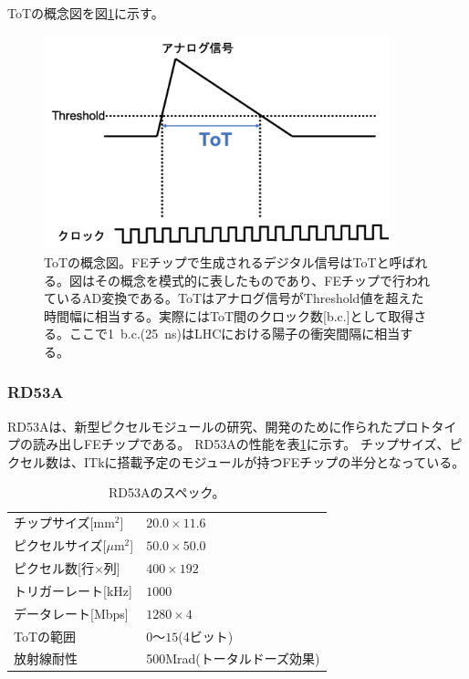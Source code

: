 ToTの概念図を図\ref{tot_algorithm}に示す。

\begin{figure}[bpt]\centering
\includegraphics[width=10cm]{./tot_algorithm.png}
\caption[ToTの概念図]{ToTの概念図。FEチップで生成されるデジタル信号はToTと呼ばれる。図はその概念を模式的に表したものであり、FEチップで行われているAD変換である。ToTはアナログ信号がThreshold値を超えた時間幅に相当する。実際にはToT間のクロック数[b.c.]として取得さる。ここで1~b.c.(25~ns)はLHCにおける陽子の衝突間隔に相当する。}
\label{tot_algorithm}
\end{figure}

\subsubsection{RD53A}
RD53A\cite{2-1}は、新型ピクセルモジュールの研究、開発のために作られたプロトタイプの読み出しFEチップである。
RD53Aの性能を表\ref{rd53a_spec}に示す。
チップサイズ、ピクセル数は、ITkに搭載予定のモジュールが持つFEチップの半分となっている。

\begin{table}[tbp]
\begin{center}
\caption[RD53Aのスペック]{RD53Aのスペック。}
\label{rd53a_spec}
  \begin{tabular}{|ll|} \hline
    チップサイズ[mm$^2$] & $20.0\times 11.6$ \\ 
    ピクセルサイズ[$\mu$m$^2$] & $50.0\times 50.0$ \\ 
    ピクセル数[行$\times$列] & $400\times 192$ \\ 
    トリガーレート[kHz] & $1000$ \\ 
    データレート[Mbps] & $1280\times4$ \\ 
    ToTの範囲 & $0〜15$(4ビット) \\
    放射線耐性 & 500Mrad(トータルドーズ効果\cite{2-4}) \\\hline
  \end{tabular}
\end{center}
\end{table}

